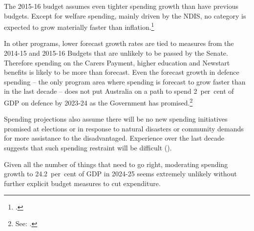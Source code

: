 \documentclass[twoside,english]{palatinob5ona4portrait}
\begin{document}
The 2015-16 budget assumes even tighter spending growth than have previous budgets. Except for welfare spending, mainly driven by the NDIS, no category is expected to grow materially faster than inflation.\footcite[][BP No.~1, pp.~5-11]{Treasury2015BudgetPapers201516}  

In other programs, lower forecast growth rates are tied to measures from the 2014-15 and 2015-16 Budgets that are unlikely to be passed by the Senate. Therefore spending on the Carers Payment, higher education and Newstart benefits is likely to be more than forecast\DEVIATION{}. Even the forecast growth in defence spending – the only program area where spending is forecast to grow faster than in the last decade – does not put Australia on a path to spend 2~per~cent of GDP on defence by 2023-24 as the Government has promised.\footnote{See: \textcite[][1]{Defence2014}.} 


Spending projections also assume there will be no new spending initiatives promised at elections or in response to natural disasters or community demands for more assistance to the disadvantaged. Experience over the last decade suggests that such spending restraint will be difficult ().

Given all the number of things that need to go right, moderating spending growth to 24.2~per~cent of GDP in 2024-25 seems extremely unlikely without further explicit budget measures to cut expenditure.
\end{document}
